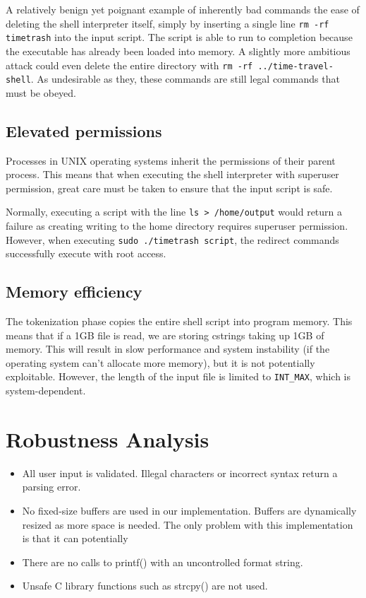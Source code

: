 \documentclass[12pt]{article}
\begin{document}
A relatively benign yet poignant example of inherently bad commands the ease of deleting the shell interpreter itself, simply by inserting a single line \texttt{rm -rf timetrash} into the input script. The script is able to run to completion because the executable has already been loaded into memory. A slightly more ambitious attack could even delete the entire directory with \texttt{rm -rf ../time-travel-shell}. As undesirable as they, these commands are still legal commands that must be obeyed.

\subsection{Elevated permissions}
Processes in UNIX operating systems inherit the permissions of their parent process. This means that when executing the shell interpreter with superuser permission, great care must be taken to ensure that the input script is safe.

Normally, executing a script with the line \texttt{ls > /home/output} would return a failure as creating writing to the home directory requires superuser permission. However, when executing \texttt{sudo ./timetrash script}, the redirect commands successfully execute with root access.

\subsection{Memory efficiency}
The tokenization phase copies the entire shell script into program memory. This means that if a 1GB file is read, we are storing cstrings taking up 1GB of memory. This will result in slow performance and system instability (if the operating system can't allocate more memory), but it is not potentially exploitable. However, the length of the input file is limited to \texttt{INT\_MAX}, which is system-dependent.

\section{Robustness Analysis}

\begin{itemize}
	\item All user input is validated. Illegal characters or incorrect syntax return a parsing error. 
	\item No fixed-size buffers are used in our implementation. Buffers are dynamically resized as more space is needed. The only problem with this implementation is that it can potentially 
	\item There are no calls to printf() with an uncontrolled format string.
	\item Unsafe C library functions such as strcpy() are not used.
\end{itemize}
\end{document}
